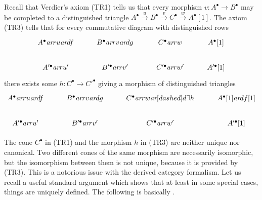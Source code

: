\documentclass[draft,leqno,12pt]{article}
\theoremstyle{plain}
\theoremstyle{definition}
\newcommand{\ar}{\text{\it ar}}
\begin{document}
Recall that Verdier's axiom (TR1) tells us that every morphism
$v\colon A^\bullet \to B^\bullet$ may be completed to a distinguished triangle
$A^\bullet \xrightarrow{u} B^\bullet \xrightarrow{v} C^\bullet \xrightarrow{w} A^\bullet [1]$.
The axiom (TR3) tells that for every commutative diagram with
distinguished rows
\begin{equation}
  \label{eqn:TR3-input}
  \begin{tikzcd}
    A^\bullet\ar{r}{u}\ar{d}{f} & B^\bullet\ar{r}{v}\ar{d}{g} & C^\bullet\ar{r}{w} & A^\bullet [1] \\
    A'^\bullet\ar{r}{u'} & B'^\bullet\ar{r}{v'} & C'^\bullet\ar{r}{w'} & A'^\bullet [1]
  \end{tikzcd}
\end{equation}
there exists some $h\colon C^\bullet \to C'^\bullet$ giving a morphism of
distinguished triangles
\begin{equation}
  \label{eqn:TR3-output}
  \begin{tikzcd}
    A^\bullet\ar{r}{u}\ar{d}{f} & B^\bullet\ar{r}{v}\ar{d}{g} & C^\bullet\ar{r}{w}\ar[dashed]{d}{\exists h} & A^\bullet [1]\ar{d}{f [1]} \\
    A'^\bullet\ar{r}{u'} & B'^\bullet\ar{r}{v'} & C'^\bullet\ar{r}{w'} & A'^\bullet [1]
  \end{tikzcd}
\end{equation}

The cone $C^\bullet$ in (TR1) and the morphism $h$ in (TR3) are neither unique
nor canonical. Two different cones of the same morphism are necessarily
isomorphic, but the isomorphism between them is not unique, because it is
provided by (TR3). This is a notorious issue with the derived category
formalism. Let us recall a useful standard argument which shows that at least in
some special cases, things are uniquely defined. The following is basically
\cite[Proposition~1.1.9, Corollaire~1.1.10]{Beilinson-Bernstein-Deligne}.
\end{document}

